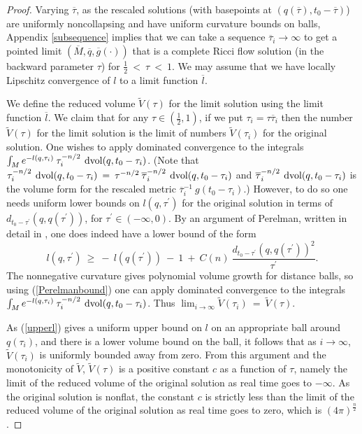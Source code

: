 \begin{proof}
Varying $\overline{\tau}$, as the rescaled solutions
(with basepoints at $(q(\overline{\tau}), t_0 - \overline{\tau})$)
are uniformly noncollapsing and have
uniform curvature bounds on balls, Appendix \ref{subsequence}
implies that
we can take
a sequence $\overline{\tau}_i \rightarrow \infty$
to get a pointed limit
$(\overline{M}, \overline{q}, \overline{g}(\cdot))$ that is
a complete Ricci flow solution (in the backward parameter $\tau$) for
$\frac12 \: < \: \tau \: < \: 1$.
We may assume that we have locally Lipschitz convergence of $l$ to
a limit function $\overline{l}$.

We define the reduced volume $\tilde{V}(\tau)$ for the limit solution
using the limit function $\overline{l}$.
We claim that for any
$\tau \in \left( \frac12, 1 \right)$, if we put $\tau_i = \tau \overline{\tau}_i$
then the number $\tilde{V}(\tau)$ for
the limit solution is the limit of numbers $\tilde{V}(\tau_i)$ for the
original solution. One wishes to apply dominated convergence to the
integrals $\int_M e^{-l(q, \tau_i)} \:
\tau_i^{-n/2} \: \operatorname{dvol}(q,t_0 - \tau_i)$.
(Note that $\tau_i^{-n/2} \: \operatorname{dvol}(q,t_0 - \tau_i) \: = \:
\tau^{-n/2} \: \overline{\tau}_i^{-n/2} \: \operatorname{dvol}(q,t_0 - \tau_i)$ and
$\overline{\tau}_i^{-n/2} \: \operatorname{dvol}(q,t_0 - \tau_i)$ is the volume form for the
rescaled metric $\overline{\tau}_i^{-1} \: g(t_0 - \tau_i)$.)
However, to do so one needs uniform lower bounds on
$l(q, \tau^\prime)$ for the original solution in terms of
$d_{t_0-\tau^\prime}(q, q(\tau^\prime))$, for $\tau^\prime \in (-\infty, 0)$.
By an argument of Perelman,
written in detail in \cite{Ye1}, one does indeed have a lower bound of the
form
\begin{equation} \label{Perelmanbound}
l(q, \tau^\prime) \: \ge \: - \: l(q(\tau^\prime)) \: - \: 1 \: + \: C(n) \:
\frac{d_{t_0-\tau^\prime}(q, q(\tau^\prime))^2}{\tau^\prime}.
\end{equation}
The nonnegative curvature gives polynomial volume growth for
distance balls,
so using (\ref{Perelmanbound})
one can apply dominated convergence to the integrals
$\int_M e^{-l(q, \tau_i)} \:
\tau_i^{-n/2} \: \operatorname{dvol}(q,t_0 - \tau_i)$.
Thus $\lim_{i \rightarrow \infty} \tilde{V}(\tau_i) \: = \:
\tilde{V}(\tau)$.

As (\ref{upperl}) gives
a uniform upper bound on $l$ on an appropriate
ball around $q(\tau_i)$, and there is a lower
volume bound on the ball, it follows that as $i \rightarrow \infty$,
$\tilde{V}(\tau_i)$ is uniformly bounded away from zero. From this
argument and the monotonicity of $\tilde{V}$,
$\tilde{V}(\tau)$ is a positive constant $c$ as a function of
$\tau$, namely the limit of the reduced volume of the original
solution as real time goes to $- \infty$. As the original solution is
nonflat, the constant $c$ is strictly less than the limit of the
reduced volume of the original solution
as real time goes to zero, which is $(4 \pi)^{\frac{n}{2}}$.


\end{proof}
